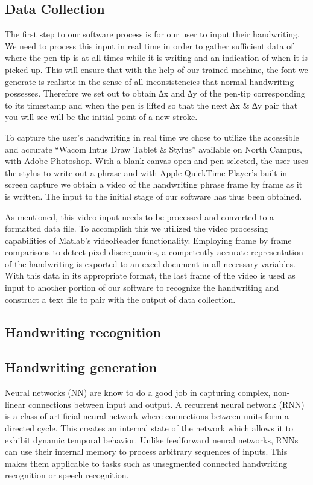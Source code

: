 \documentclass{article} %
\begin{document}
\subsection{Data Collection}

The first step to our software process is for our user to input their handwriting. We need to process this input in real time in order to gather sufficient data of where the pen tip is at all times while it is writing and an indication of when it is picked up. This will ensure that with the help of our trained machine, the font we generate is realistic in the sense of all inconsistencies that normal handwriting possesses. Therefore we set out to obtain ∆x and ∆y of the pen-tip corresponding to its timestamp and when the pen is lifted so that the next ∆x \& ∆y pair that you will see will be the initial point of a new stroke. 

To capture the user’s handwriting in real time we chose to utilize the accessible and accurate “Wacom Intus Draw Tablet \& Stylus” available on North Campus, with Adobe Photoshop. With a blank canvas open and pen selected, the user uses the stylus to write out a phrase and with Apple QuickTime Player’s built in screen capture we obtain a video of the handwriting phrase frame by frame as it is written. The input to the initial stage of our software has thus been obtained. 

As mentioned, this video input needs to be processed and converted to a formatted data file. To accomplish this we utilized the video processing capabilities of Matlab’s videoReader functionality. Employing frame by frame comparisons to detect pixel discrepancies, a competently accurate representation of the handwriting is exported to an excel document in all necessary variables. With this data in its appropriate format, the last frame of the video is used as input to another portion of our software to recognize the handwriting and construct a text file to pair with the output of data collection.

\subsection{Handwriting recognition}
\subsection{Handwriting generation}

Neural networks (NN) are know to do a good job in capturing complex, non-linear connections between input and output. A recurrent neural network (RNN) is a class of artificial neural network where connections between units form a directed cycle. This creates an internal state of the network which allows it to exhibit dynamic temporal behavior. Unlike feedforward neural networks, RNNs can use their internal memory to process arbitrary sequences of inputs. This makes them applicable to tasks such as unsegmented connected handwriting recognition or speech recognition. 
\end{document}
